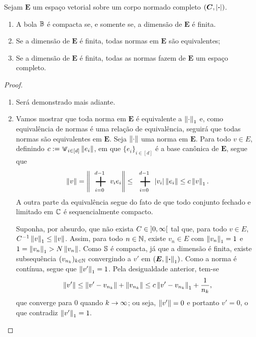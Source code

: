 \begin{proposition}
Sejam $\bm E$ um espaço vetorial sobre um corpo normado completo $(\bm C,\abs{\var})$.
	\begin{enumerate}
	\item A bola $\B$ é compacta se, e somente se, a dimensão de $\bm E$ é finita.
	\item Se a dimensão de $\bm E$ é finita, todas normas em $\bm E$ são equivalentes;
	\item Se a dimensão de $\bm E$ é finita, todas as normas fazem de $\bm E$ um espaço completo. 
	\end{enumerate}
\end{proposition}
\begin{proof}
	\begin{enumerate}
	\item Será demonstrado mais adiante.
	
	\item Vamos mostrar que toda norma em $\bm E$ é equivalente a $\nor{\cdot}_1$ e, como equivalência de normas é uma relação de equivalência, seguirá que todas normas são equivalentes em $\bm E$. Seja $\nor{\cdot}$ uma norma em $\bm E$. Para todo $v \in E$, definindo $c := \max_{i \in [d]} \nor{e_i}$, em que $\{e_i\}_{i \in [d]}$ é a base canônica de $\bm E$, segue que
	\begin{equation*}
	\nor{v} = \nor{\sum_{i=0}^{d-1} v_ie_i} \leq \sum_{i=0}^{d-1}\abs{v_i}\nor{e_i} \leq c\nor{v}_1.
	\end{equation*}
A outra parte da equivalência segue do fato de que todo conjunto fechado e limitado em $\C$ é sequencialmente compacto.

Suponha, por absurdo, que não exista $C \in \intaa{0}{\infty}$ tal que, para todo $v \in E$, $C\inv\nor{v}_1 \leq \nor{v}$. Assim, para todo $n \in \N$, existe $v_n \in E$ com $\nor{v_n}_1 = 1$ e $1 = \nor{v_n}_1 > N\nor{v_n}$. Como $\S$ é compacta, já que a dimensão é finita, existe subsequência $(v_{n_k})_{k \in \N}$ convergindo a $v'$ em $(\bm E,\nor{\var}_1)$. Como a norma é contínua, segue que $\nor{v'}_1 = 1$. Pela desigualdade anterior, tem-se
	\begin{equation*}
	\nor{v'} \leq \nor{v' - v_{n_k}} + \nor{v_{n_k}} \leq c\nor{v' - v_{n_k}}_1 + \frac{1}{n_k},
	\end{equation*}
que converge para $0$ quando $k \conv \infty$; ou seja, $\nor{v'}=0$ e portanto $v'=0$, o que contradiz $\nor{v'}_1=1$.


\end{enumerate}
\end{proof}
